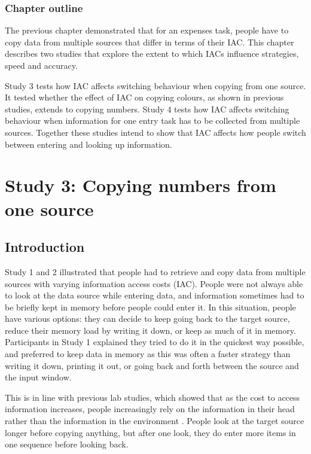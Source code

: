 \documentclass[11pt,oneside]{report}
\begin{document}
\begin{mynote}
\subsubsection{Chapter outline}
The previous chapter demonstrated that for an expenses task, people have to copy data from multiple sources that differ in terms of their IAC. This chapter describes two studies that explore the extent to which IACs influence strategies, speed and accuracy. 

Study 3 tests how IAC affects switching behaviour when copying from one source. It tested whether the effect of IAC on copying colours, as shown in previous studies, extends to copying numbers. Study 4 tests how IAC affects switching behaviour when information for one entry task has to be collected from multiple sources.
Together these studies intend to show that IAC affects how people switch between entering and looking up information.

\end{mynote}

 
\section{Study 3: Copying numbers from one source}\label{ch:Study2}
\subsection{Introduction}
Study 1 and 2 illustrated that people had to retrieve and copy data from multiple sources with varying information access costs (IAC). People were not always able to look at the data source while entering data, and information sometimes had to be briefly kept in memory before people could enter it.
In this situation, people have various options: they can decide to keep going back to the target source, reduce their memory load by writing it down, or keep as much of it in memory. Participants in Study 1 explained they tried to do it in the quickest way possible, and preferred to keep data in memory as this was often a faster strategy than writing it down, printing it out, or going back and forth between the source and the input window.

This is in line with previous lab studies, which showed that as the cost to access information increases, people increasingly rely on the information in their head rather than the information in the environment \citep[e.g.][]{Gray2006, Morgan2009}. People look at the target source longer before copying anything, but after one look, they do enter more items in one sequence before looking back. 
\end{document}
